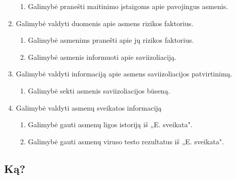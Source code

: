 \documentclass{VUMIFPSkursinis}
\begin{document}
\begin{enumerate}
\begin{enumerate}
		      \item{Galimybė pranešti maitinimo įstaigoms apie pavojingus asmenis.}
	      \end{enumerate}
	\item{Galimybė valdyti duomenis apie asmens rizikos faktorius.}
	      \begin{enumerate}
		      \item{Galimybė asmenims pranešti apie jų rizikos faktorius.}
		      \item{Galimybė asmenis informuoti apie saviizoliaciją.}
	      \end{enumerate}
	\item{Galimybė valdyti informaciją apie asmens saviizoliacijos patvirtinimą.}
	      \begin{enumerate}
		      \item{Galimybė sekti asmenis saviizoliacijos būseną.}
	      \end{enumerate}
	\item{Galimybė valdyti asmenų sveikatos informaciją}
	      \begin{enumerate}
		      \item{Galimybė gauti asmenų ligos istoriją iš „E. sveikata".}
		      \item{Galimybė gauti asmenų viruso testo rezultatus iš „E. sveikata".}
	      \end{enumerate}
\end{enumerate}

\subsection{Ką?}\label{sec:versloReqWhat}
\end{document}
